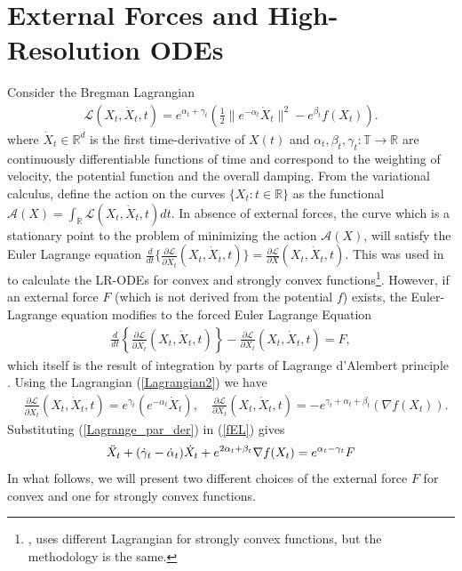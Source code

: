 \documentclass{article}
\theoremstyle{plain}
\theoremstyle{definition}
\theoremstyle{remark}
\begin{document}
 
\section{External Forces and High-Resolution ODEs}\label{section2}
Consider the Bregman Lagrangian
\begin{align}\label{Lagrangian2}
    \mathcal{L}(X_t,\dot{X}_t,t) =e^{\alpha_t+\gamma_t}\left(\frac{1}{2}\|e^{-\alpha_t}\dot{X}_t\|^2-e^{\beta_t}f(X_t)\right). 
\end{align}
where \(\dot{X}_t\in \mathbb{R}^d\) is the first time-derivative of \(X(t)\) and \(\alpha_t,\beta_t,\gamma_t:\mathbb{T}\rightarrow \mathbb{R}\) are continuously differentiable functions of time and correspond to the weighting of velocity, the potential function and the overall damping. From the variational calculus, define the action on the curves \(\{X_t:t\in \mathbb R\}\) as the functional \(\mathcal{A}(X)=\int_{\mathbb R}\mathcal{L}(X_t,\dot X_t,t)dt \). In absence of external forces, the curve which is a stationary point to the problem of minimizing the action \(\mathcal{A}(X)\), will satisfy the Euler Lagrange equation \({\tfrac{d}{dt}\{  \tfrac{\partial \mathcal{L}}{\partial \dot{X}_t}(X_t,\dot{X}_t,t)  \}=\tfrac{\partial \mathcal{L}}{\partial X}(X_t,\dot{X}_t,t)}\). This was used in \citep{WibisonoE7351,wilson2021lyapunov} to calculate the LR-ODEs for convex and strongly convex functions\footnote{\citep{wilson2021lyapunov}, uses different Lagrangian for strongly convex functions, but the methodology is the same.}. However, if an external force \(F\) (which is not derived from the potential \(f\)) exists, the Euler-Lagrange equation modifies to the forced Euler Lagrange Equation
\begin{align}\label{fEL}
        \frac{d}{dt}\left\{  \frac{\partial \mathcal{L}}{\partial \dot{X}_t}(X_t,\dot{X}_t,t)  \right\}-\frac{\partial \mathcal{L}}{\partial X_t}(X_t,\dot{X}_t,t)=F,
\end{align}
which itself is the result of integration by parts of Lagrange d'Alembert principle \citep{campos2021discrete}. Using the Lagrangian (\ref{Lagrangian2}) we have
\begin{align}\label{Lagrange_par_der}
  &   \frac{\partial \mathcal{L}}{\partial \dot{X}_t}(X_t,\dot{X}_t,t)  =e^{\gamma_t}(e^{-\alpha_t}\dot{X}_t),\quad \frac{\partial \mathcal{L}}{\partial X_t}(X_t,\dot{X}_t,t)= -e^{\gamma_t+\alpha_t+\beta_t}(\nabla f(X_t)).
\end{align}
Substituting (\ref{Lagrange_par_der}) in (\ref{fEL}) gives
\begin{align}\label{HR_general_ODE_F}
    \Ddot{X}_t + (\dot{\gamma}_t-\dot{\alpha}_t)\dot{X}_t+e^{2\alpha_t+\beta_t}\nabla f(X_t) =e^{\alpha_t-\gamma_t} F
\end{align}
In what follows, we will present two different choices of the external force \(F\) for convex and one for strongly convex functions. 
\end{document}
